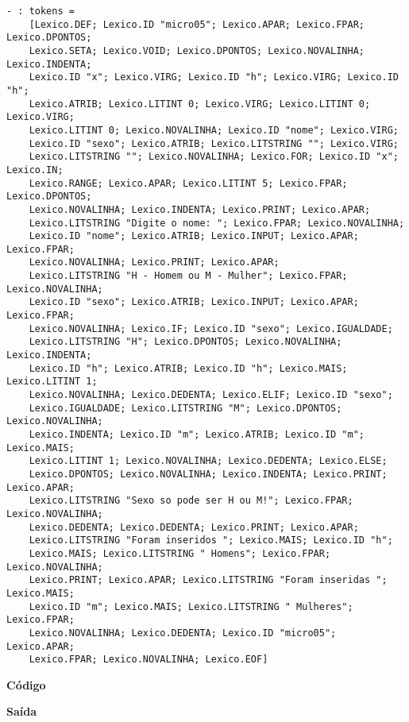 \documentclass[hidelinks,12pt]{article}
\begin{document}
	\begin{lstlisting}[caption=Analisador Léxico]
	- : tokens =
	[Lexico.DEF; Lexico.ID "micro05"; Lexico.APAR; Lexico.FPAR; Lexico.DPONTOS;
	Lexico.SETA; Lexico.VOID; Lexico.DPONTOS; Lexico.NOVALINHA; Lexico.INDENTA;
	Lexico.ID "x"; Lexico.VIRG; Lexico.ID "h"; Lexico.VIRG; Lexico.ID "h";
	Lexico.ATRIB; Lexico.LITINT 0; Lexico.VIRG; Lexico.LITINT 0; Lexico.VIRG;
	Lexico.LITINT 0; Lexico.NOVALINHA; Lexico.ID "nome"; Lexico.VIRG;
	Lexico.ID "sexo"; Lexico.ATRIB; Lexico.LITSTRING ""; Lexico.VIRG;
	Lexico.LITSTRING ""; Lexico.NOVALINHA; Lexico.FOR; Lexico.ID "x"; Lexico.IN;
	Lexico.RANGE; Lexico.APAR; Lexico.LITINT 5; Lexico.FPAR; Lexico.DPONTOS;
	Lexico.NOVALINHA; Lexico.INDENTA; Lexico.PRINT; Lexico.APAR;
	Lexico.LITSTRING "Digite o nome: "; Lexico.FPAR; Lexico.NOVALINHA;
	Lexico.ID "nome"; Lexico.ATRIB; Lexico.INPUT; Lexico.APAR; Lexico.FPAR;
	Lexico.NOVALINHA; Lexico.PRINT; Lexico.APAR;
	Lexico.LITSTRING "H - Homem ou M - Mulher"; Lexico.FPAR; Lexico.NOVALINHA;
	Lexico.ID "sexo"; Lexico.ATRIB; Lexico.INPUT; Lexico.APAR; Lexico.FPAR;
	Lexico.NOVALINHA; Lexico.IF; Lexico.ID "sexo"; Lexico.IGUALDADE;
	Lexico.LITSTRING "H"; Lexico.DPONTOS; Lexico.NOVALINHA; Lexico.INDENTA;
	Lexico.ID "h"; Lexico.ATRIB; Lexico.ID "h"; Lexico.MAIS; Lexico.LITINT 1;
	Lexico.NOVALINHA; Lexico.DEDENTA; Lexico.ELIF; Lexico.ID "sexo";
	Lexico.IGUALDADE; Lexico.LITSTRING "M"; Lexico.DPONTOS; Lexico.NOVALINHA;
	Lexico.INDENTA; Lexico.ID "m"; Lexico.ATRIB; Lexico.ID "m"; Lexico.MAIS;
	Lexico.LITINT 1; Lexico.NOVALINHA; Lexico.DEDENTA; Lexico.ELSE;
	Lexico.DPONTOS; Lexico.NOVALINHA; Lexico.INDENTA; Lexico.PRINT; Lexico.APAR;
	Lexico.LITSTRING "Sexo so pode ser H ou M!"; Lexico.FPAR; Lexico.NOVALINHA;
	Lexico.DEDENTA; Lexico.DEDENTA; Lexico.PRINT; Lexico.APAR;
	Lexico.LITSTRING "Foram inseridos "; Lexico.MAIS; Lexico.ID "h";
	Lexico.MAIS; Lexico.LITSTRING " Homens"; Lexico.FPAR; Lexico.NOVALINHA;
	Lexico.PRINT; Lexico.APAR; Lexico.LITSTRING "Foram inseridas "; Lexico.MAIS;
	Lexico.ID "m"; Lexico.MAIS; Lexico.LITSTRING " Mulheres"; Lexico.FPAR;
	Lexico.NOVALINHA; Lexico.DEDENTA; Lexico.ID "micro05"; Lexico.APAR;
	Lexico.FPAR; Lexico.NOVALINHA; Lexico.EOF]
	\end{lstlisting}
	
	
	{\large \textbf{Código} }
			
	
	{\large \textbf{Saída}}
	
\end{document}

